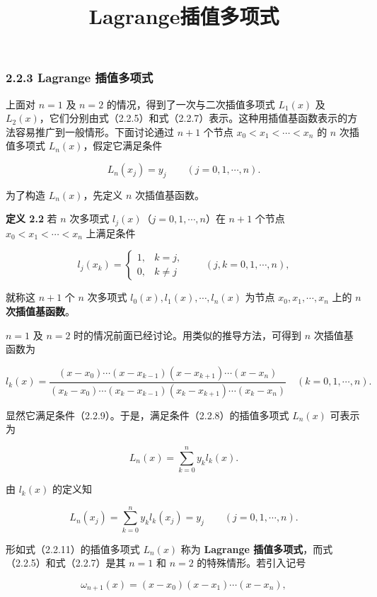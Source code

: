 \documentclass[
  10pt,
  fontset=fandol]{ctexart}
\title{Lagrange插值多项式}
\author{}
\date{}
\begin{document}
\maketitle

\subsubsection{2.2.3 Lagrange 插值多项式}\label{lagrange-ux63d2ux503cux591aux9879ux5f0f}

上面对 \(n=1\) 及 \(n=2\) 的情况，得到了一次与二次插值多项式 \(L_1(x)\) 及 \(L_2(x)\)，它们分别由式（2.2.5）和式（2.2.7）表示。这种用插值基函数表示的方法容易推广到一般情形。下面讨论通过 \(n+1\) 个节点 \(x_0<x_1<\cdots<x_n\) 的 \(n\) 次插值多项式 \(L_n(x)\)，假定它满足条件

\[
L_n(x_j)=y_j\qquad(j=0,1,\cdots,n).
\tag{2.2.8}
\]

为了构造 \(L_n(x)\)，先定义 \(n\) 次插值基函数。

\textbf{定义 2.2} 若 \(n\) 次多项式 \(l_j(x)\)（\(j=0,1,\cdots,n\)）在 \(n+1\) 个节点 \(x_0<x_1<\cdots<x_n\) 上满足条件

\[
l_j(x_k)=
\begin{cases}
1,&k=j,\\
0,&k\ne j
\end{cases}
\qquad(j,k=0,1,\cdots,n),
\tag{2.2.9}
\]

就称这 \(n+1\) 个 \(n\) 次多项式 \(l_0(x),l_1(x),\cdots,l_n(x)\) 为节点 \(x_0,x_1,\cdots,x_n\) 上的 \textbf{\(n\) 次插值基函数}。

\(n=1\) 及 \(n=2\) 时的情况前面已经讨论。用类似的推导方法，可得到 \(n\) 次插值基函数为

\[
l_k(x)=
\frac{(x-x_0)\cdots(x-x_{k-1})(x-x_{k+1})\cdots(x-x_n)}
{(x_k-x_0)\cdots(x_k-x_{k-1})(x_k-x_{k+1})\cdots(x_k-x_n)}
\quad(k=0,1,\cdots,n).
\tag{2.2.10}
\]

显然它满足条件（2.2.9）。于是，满足条件（2.2.8）的插值多项式 \(L_n(x)\) 可表示为

\[
L_n(x)=\sum_{k=0}^{n}y_kl_k(x).
\tag{2.2.11}
\]

由 \(l_k(x)\) 的定义知

\[
L_n(x_j)=\sum_{k=0}^{n}y_kl_k(x_j)=y_j
\qquad(j=0,1,\cdots,n).
\]

形如式（2.2.11）的插值多项式 \(L_n(x)\) 称为 \textbf{Lagrange 插值多项式}，而式（2.2.5）和式（2.2.7）是其 \(n=1\) 和 \(n=2\) 的特殊情形。若引入记号

\[
\omega_{n+1}(x)=(x-x_0)(x-x_1)\cdots(x-x_n),
\tag{2.2.12}
\]
\end{document}
